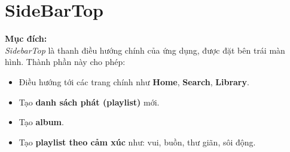 \section{SideBarTop}

\textbf{Mục đích:} \\
\textit{SidebarTop} là thanh điều hướng chính của ứng dụng, được đặt bên trái màn hình. Thành phần này cho phép:
\begin{itemize}
  \item Điều hướng tới các trang chính như \textbf{Home}, \textbf{Search}, \textbf{Library}.
  \item Tạo \textbf{danh sách phát (playlist)} mới.
  \item Tạo \textbf{album}.
  \item Tạo \textbf{playlist theo cảm xúc} như: vui, buồn, thư giãn, sôi động.
\end{itemize}

